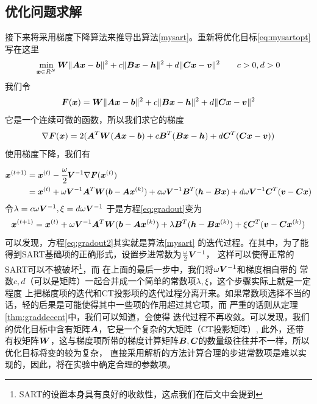 \subsection{优化问题求解}
接下来将采用梯度下降算法来推导出算法\ref{mysart}。重新将优化目标\ref{eq:mysartopt}写在这里
\begin{equation}
\min_{\bm{ x}\in R^N}\bm{W}\lVert\bm{A}\bm{ x}-\bm{b}\rVert^2 +c\lVert\bm{B}\bm{ x}-\bm{h}\rVert^2+d\lVert\bm{C}\bm{ x}-\bm{v}\rVert^2 \qquad c>0,d>0
\end{equation}
我们令
\begin{equation*}
\bm{F}(\bm{ x}) = \bm{W}\lVert\bm{A}\bm{ x}-\bm{b}\rVert^2 +c\lVert\bm{B}\bm{ x}-\bm{h}\rVert^2+d\lVert\bm{C}\bm{ x}-\bm{v}\rVert^2
\end{equation*}
它是一个连续可微的函数，所以我们求它的梯度
\begin{equation*}
\nabla \bm{F}(\bm{ x}) = 2(\bm{A}^T\bm{W}(\bm{A}\bm{ x}-\bm{b})+c\bm{B}^T(\bm{B}\bm{ x}-\bm{h})+d\bm{C}^T(\bm{C}\bm{ x}-\bm{v}))
\end{equation*}
使用梯度下降，我们有
\begin{equation}\label{eq:gradout}
\begin{split}
\bm{ x}^{(t+1)}&=\bm{ x}^{(t)}-\cfrac{\omega}{2}\bm{V}^{-1}\nabla \bm{F}(\bm{ x}^{(t)})\\
&=\bm{ x}^{(t)} + \omega\bm{V}^{-1}\bm{A}^T\bm{W}(\bm{b}-\bm{A}\bm{ x}^{(k)})
           + c\omega\bm{V}^{-1}\bm{B}^T(\bm{h}-\bm{B}\bm{ x})
           + d\omega\bm{V}^{-1}\bm{C}^T(\bm{v}-\bm{C}\bm{ x})
\end{split}
\end{equation}
令$\lambda = c\omega\bm{V}^{-1},\xi = d\omega\bm{V}^{-1}$
于是方程\eqref{eq:gradout}变为
\begin{equation}\label{eq:gradout2}
\bm{ x}^{(t+1)}= \bm{ x}^{(t)} + \omega\bm{V}^{-1}\bm{A}^T\bm{W}(\bm{b}-\bm{A}\bm{ x}^{(k)})
           + \lambda \bm{B}^T(\bm{h}-\bm{B}\bm{ x}^{(k)})
           + \xi \bm{C}^T(\bm{v}-\bm{C}\bm{ x}^{(k)})
\end{equation}
可以发现，方程\eqref{eq:gradout2}其实就是算法\ref{mysart}
的迭代过程。在其中，为了能得到SART基础项的正确形式，设置步进常数为$\tfrac{\omega}{2}\bm{V}^{-1}$，
这样可以使得正常的SART可以不被破坏\footnote{SART的设置本身具有良好的收敛性，这点我们在后文中会提到}，而
在上面的最后一步中，我们将$\omega\bm{V}^{-1}$和梯度相自带的
常数$c,d$（可以是矩阵）一起合并成一个简单的常数项$\lambda ,\xi$，这个步骤实际上就是一定程度
上把梯度项的迭代和CT投影项的迭代过程分离开来。如果常数项选择不当的话，轻的后果是可能使得其中一些项的作用超过其它项，而
严重的话则从定理
\ref{thm:graddecent}中，我们可以知道，会使得
迭代过程不再收敛。可以发现，我们的优化目标中含有矩阵$\bm{A}$，它是一个复杂的大矩阵（CT投影矩阵）,
此外，还带有权矩阵$\bm{W}$，这与梯度项所带的梯度计算矩阵$\bm{B},\bm{C}$的数量级往往并不一样，所以优化目标将变的较为复杂，
直接采用解析的方法计算合理的步进常数项是难以实现的，因此，将在实验中确定合理的参数项。

